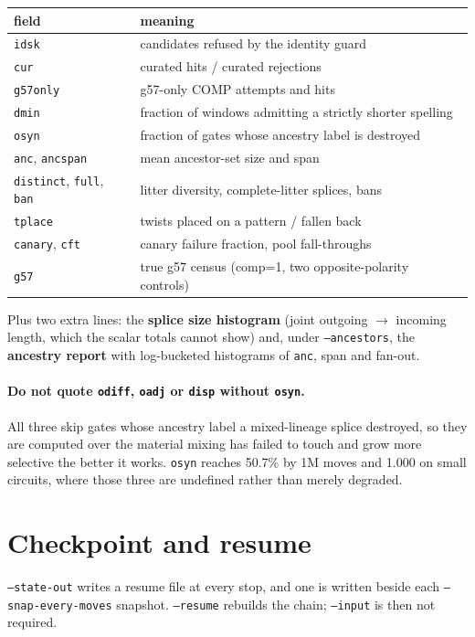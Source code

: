 \documentclass[11pt]{article}
\begin{document}
\begin{center}
\begin{tabular}{ll}
\toprule
field & meaning \\
\midrule
\texttt{idsk} & candidates refused by the identity guard \\
\texttt{cur} & curated hits / curated rejections \\
\texttt{g57only} & g57-only COMP attempts and hits \\
\texttt{dmin} & fraction of windows admitting a strictly shorter spelling \\
\texttt{osyn} & fraction of gates whose ancestry label is destroyed \\
\texttt{anc}, \texttt{ancspan} & mean ancestor-set size and span \\
\texttt{distinct}, \texttt{full}, \texttt{ban} & litter diversity, complete-litter splices, bans \\
\texttt{tplace} & twists placed on a pattern / fallen back \\
\texttt{canary}, \texttt{cft} & canary failure fraction, pool fall-throughs \\
\texttt{g57} & true g57 census (comp=1, two opposite-polarity controls) \\
\bottomrule
\end{tabular}
\end{center}

Plus two extra lines: the \textbf{splice size histogram} (joint outgoing
$\to$ incoming length, which the scalar totals cannot show) and, under
\texttt{--ancestors}, the \textbf{ancestry report} with log-bucketed histograms
of \texttt{anc}, span and fan-out.

\paragraph{Do not quote \texttt{odiff}, \texttt{oadj} or \texttt{disp} without
\texttt{osyn}.} All three skip gates whose ancestry label a mixed-lineage splice
destroyed, so they are computed over the material mixing has failed to touch and
grow more selective the better it works. \texttt{osyn} reaches 50.7\% by 1M moves
and 1.000 on small circuits, where those three are undefined rather than merely
degraded.

\section{Checkpoint and resume}

\texttt{--state-out} writes a resume file at every stop, and one is written
beside each \texttt{--snap-every-moves} snapshot. \texttt{--resume} rebuilds the
chain; \texttt{--input} is then not required.
\end{document}
